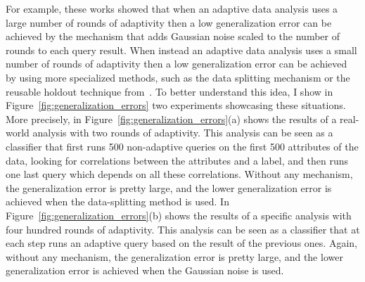 For example, these works showed that when an adaptive data analysis uses a large number of rounds 
of adaptivity then a low generalization error can be achieved by the mechanism that 
adds Gaussian noise scaled to the number of rounds to each query result.
When instead an adaptive data analysis uses a small number of rounds of adaptivity then a low generalization error can be achieved by using more specialized methods, such as the data splitting mechanism or the reusable holdout technique from~\cite{DworkFHPRR15}.
To better understand this idea, I show in Figure~\ref{fig:generalization_errors} two experiments showcasing these situations. 
More precisely, in Figure~\ref{fig:generalization_errors}(a) shows the results of a real-world analysis
with two rounds of adaptivity. 
This analysis can be seen as a classifier that first runs 500 non-adaptive queries on the first 500 attributes of the data, looking for correlations between the attributes and a label, and then runs one last query which depends on all these correlations. 
Without any mechanism, the generalization error is pretty large, and the lower generalization error is achieved when the data-splitting method is used. 
In Figure~\ref{fig:generalization_errors}(b) shows the results of a specific analysis
with four hundred rounds of adaptivity. 
This analysis can be seen as a classifier that at each step runs an adaptive query based on the result of the previous ones. 
Again, without any mechanism, the generalization error is pretty large, and the lower generalization error is achieved when the Gaussian noise is used. 
